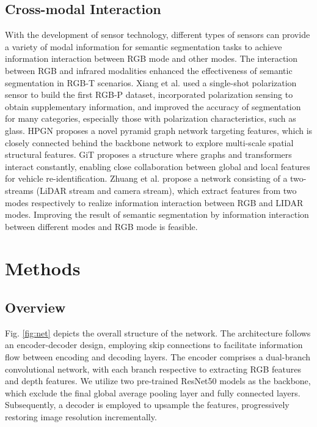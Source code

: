 \documentclass{aims}
\numberwithin{equation}{section}
\begin{document}
\subsection{Cross-modal Interaction}
With the development of sensor technology, different types of sensors can provide a variety of modal information for semantic segmentation tasks to achieve information interaction \cite{ha2017mfnet, shen2023triplet, zhang2021abmdrnet, shen2023pbsl, sun2019rtfnet}  between RGB mode and other modes.  The interaction between RGB and infrared modalities enhanced the effectiveness of semantic segmentation in RGB-T scenarios. Xiang et al. \cite{xiang2021polarization} used a single-shot polarization sensor to build the first RGB-P dataset, incorporated polarization sensing to obtain supplementary information, and improved the accuracy of segmentation for many categories, especially those with polarization characteristics, such as glass. HPGN \cite{shen2021exploring} proposes a novel pyramid graph network targeting features, which is closely connected behind the backbone network to explore multi-scale spatial structural features. GiT \cite{shen2023git}  proposes a structure where graphs and transformers interact constantly, enabling close collaboration between global and local features for vehicle re-identification. Zhuang et al. \cite{zhuang2021perception} propose a network consisting of a two-streams (LiDAR stream and camera stream), which extract features from two modes respectively to realize information interaction between RGB and LIDAR modes. Improving the result of semantic segmentation by information interaction between different modes and RGB mode is feasible.

\section{Methods}


\subsection{Overview} 
Fig. \ref{fig:net} depicts the overall structure of the network. The architecture follows an encoder-decoder design, employing skip connections to facilitate information flow between encoding and decoding layers. The encoder comprises a dual-branch convolutional network, with each branch respective to extracting RGB features and depth features. We utilize two pre-trained ResNet50 models as the backbone, which exclude the final global average pooling layer and fully connected layers. Subsequently, a decoder is employed to upsample the features, progressively restoring image resolution incrementally.
\end{document}
